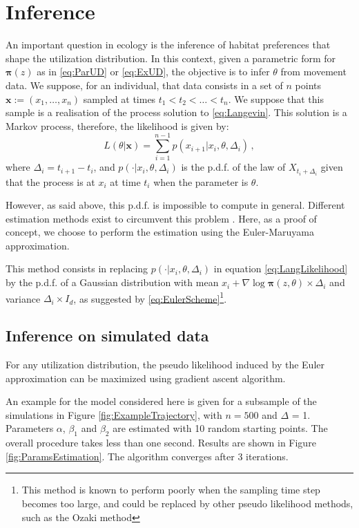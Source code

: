 \documentclass[10pt,a4paper, draft]{article}
\newcommand{\ud}{\boldsymbol{\pi}}
\begin{document}
\section{Inference}
\label{sec:inference}
An important question in ecology is the inference of habitat preferences that shape the utilization distribution. In this context, given a parametric form for $\ud(z)$ as in \eqref{eq:ParUD} or \eqref{eq:ExUD}, the objective is to infer $\theta$ from movement data. We suppose, for an individual, that data consists in a set of $n$ points $\mathbf{x} :=(x_1, \dots, x_n)$ sampled at times $t_1< t_2<\dots < t_n$. We suppose that this sample is a realisation of the process solution to \eqref{eq:Langevin}. This solution is a Markov process, therefore, the  likelihood is given by:
\begin{equation}
\label{eq:LangLikelihood}
L(\theta\vert \mathbf{x}) = \sum_{i = 1}^{n - 1} p(x_{i+1}\vert x_i, \theta, \Delta_i)\,,
\end{equation}
where $\Delta_i = t_{i+1} - t_i$, and  $p(\cdot\vert x_i, \theta, \Delta_i)$ is the p.d.f. of the law of $X_{t_i + \Delta_i}$ given that the process is at $x_i$ at time $t_i$ when the parameter is $\theta$. 

However, as said above, this p.d.f. is impossible to compute in general. Different estimation methods exist to circumvent this problem \citep{gloaguen2017stochastic}. Here, as a proof of concept, we choose to perform the estimation using the Euler-Maruyama approximation. 

This method consists in replacing $p(\cdot\vert x_i, \theta, \Delta_i)$ in equation \eqref{eq:LangLikelihood} by the p.d.f. of a Gaussian distribution with mean $x_i + \nabla \log \ud(z, \theta)\times \Delta_i$ and variance $\Delta_i \times I_d$, as suggested by \eqref{eq:EulerScheme}\footnote{This method is known to perform poorly when the sampling time step becomes too large, and could be replaced by other pseudo likelihood methods, such as the Ozaki method}.
\subsection{Inference on simulated data}
For any utilization distribution, the pseudo likelihood induced by the Euler approximation can be maximized using gradient ascent algorithm. 

An example for the model considered here is given for a subsample of the simulations in Figure \ref{fig:ExampleTrajectory}, with $n = 500$ and $\Delta$ = 1. Parameters $\alpha$, $\beta_1$ and $\beta_2$ are estimated with 10 random starting points. The overall procedure takes less than one second. Results are shown in Figure \ref{fig:ParamsEstimation}. The algorithm converges after 3 iterations. 
\end{document}
